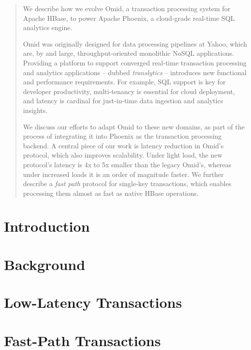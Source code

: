 \documentclass{vldb}
\begin{document}
\begin{abstract}


We describe how we evolve Omid, a transaction processing system for Apache HBase, 
to power Apache Phoenix, a cloud-grade real-time SQL analytics engine.  

Omid was originally designed for data processing pipelines at Yahoo, which are, by and large, 
throughput-oriented monolithic NoSQL applications. 
Providing a platform 
to support 
converged real-time transaction processing and analytics applications --
dubbed {\em translytics} --  
introduces new functional and performance requirements. For example, SQL 
support is key for developer productivity, multi-tenancy is essential for cloud deployment, 
and latency is cardinal for just-in-time data ingestion and analytics insights.

We discuss our efforts to adapt Omid to these new domains, 
as part of 
the process of integrating it into Phoenix as the transaction processing backend. A central piece
of our work is latency reduction in Omid's protocol, which also improves  scalability.  
Under light load, the new protocol's latency is 4x to 5x smaller than the legacy Omid's, whereas 
under increased loads it is an order of magnitude faster. We further describe a \emph{fast path} 
protocol for single-key transactions, which enables processing them almost as fast 
as native HBase operations.

\end{abstract}


\section{Introduction} \label{sec:intro}
 

\section{Background} \label{sec:api}


\section{Low-Latency Transactions} \label{sec:ll}



\section{Fast-Path Transactions}
\label{sec:alg}

\end{document}
